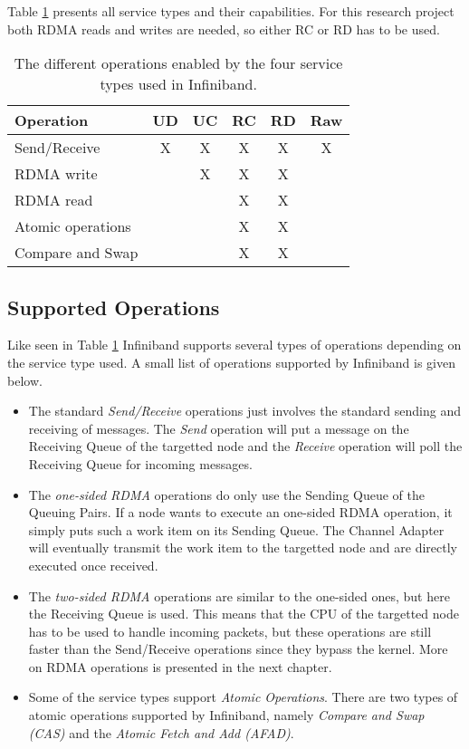 Table \ref{tab:service_type_capabilities} presents all service types and their capabilities. For this research project both RDMA reads and writes are needed, so either RC or RD has to be used. 

\begin{table}[ht]
	\centering
	\begin{tabular}{| l | c | c | c | c | c |}
		\hline
		\textbf{Operation} & \textbf{UD} & \textbf{UC} & \textbf{RC} & \textbf{RD} & \textbf{Raw} \\ 
		\hline 
		Send/Receive & X & X & X & X & X \\
		RDMA write &  & X & X & X &  \\
		RDMA read &  &  & X & X &  \\
		Atomic operations &  &  & X & X & \\
		Compare and Swap &  &  & X & X & \\
		\hline
	\end{tabular}
	\caption{The different operations enabled by the four service types used in Infiniband.}
	\label{tab:service_type_capabilities}
\end{table}

\subsection{Supported Operations}
Like seen in Table \ref{tab:service_type_capabilities} Infiniband supports several types of operations depending on the service type used. A small list of operations supported by Infiniband is given below.

\begin{itemize}
	\item The standard \emph{Send/Receive} operations just involves the standard sending and receiving of messages. The \emph{Send} operation will put a message on the Receiving Queue of the targetted node and the \emph{Receive} operation will poll the Receiving Queue for incoming messages.

	\item The \emph{one-sided RDMA} operations do only use the Sending Queue of the Queuing Pairs. If a node wants to execute an one-sided RDMA operation, it simply puts such a work item on its Sending Queue. The Channel Adapter will eventually transmit the work item to the targetted node and are directly executed once received.

	\item The \emph{two-sided RDMA} operations are similar to the one-sided ones, but here the Receiving Queue is used. This means that the CPU of the targetted node has to be used to handle incoming packets, but these operations are still faster than the Send/Receive operations since they bypass the kernel. More on RDMA operations is presented in the next chapter.

	\item Some of the service types support \emph{Atomic Operations}. There are two types of atomic operations supported by Infiniband, namely \emph{Compare and Swap (CAS)} and the \emph{Atomic Fetch and Add (AFAD)}. 
\end{itemize}

